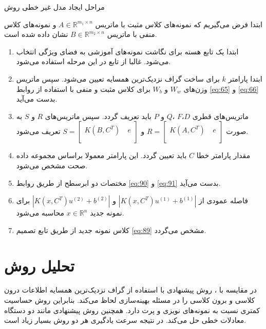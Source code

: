 \begin{algo}
	مراحل ایجاد مدل غیر خطی روش  
	
	ابتدا فرض می‌گیریم که نمونه‌های کلاس مثبت با ماتریس  $A\in {{\mathbb{R}}^{{{m}_{1}}\times n}}$ و نمونه‌های کلاس منفی با ماتریس  $B\in {{\mathbb{R}}^{{{m}_{2}}\times n}}$ نشان داده شده است.
	
	\begin{enumerate}
		\item ابتدا یک تابع هسته برای نگاشت نمونه‌های آموزشی به فضای ویژگی انتخاب می‌شود. غالبا از تابع  در این مرحله استفاده می‌شود.
		\item ابتدا پارامتر  $k$ برای ساخت گراف نزدیک‌ترین همسایه تعیین می‌شود. سپس ماتریس وزن‌های  $W_{w}$ و   $W_{b}$ برای کلاس مثبت و منفی با استفاده از روابط \ref{eq:65} و \ref{eq:66} بدست می‌آید.
		\item ماتریس‌های قطری  $D$،$F$ ،$Q$  و $P$ باید تعریف گردد. سپس ماتریس‌های $R$ و  $S$ به صورت  $R=\left[ \begin{matrix} K(A,{{C}^{T}})\ & e  \\ \end{matrix} \right]$  و $S=\left[ \begin{matrix} K(B,{{C}^{T}})\ & e  \\ \end{matrix} \right]$  تعریف می‌شود.
		\item مقدار پارامتر خطا $C$ باید تعیین گردد. این پارامتر معمولا براساس مجموعه داده صحت  مشخص می‌شود.
		\item مختصات دو ابرسطح از طریق روابط \ref{eq:90} و \ref{eq:91} بدست می‌آید.
		\item فاصله عمودی از $|K(x,{C}^{T}){{u}^{(1)}}+{{b}^{(1)}}|$ و  $|K(x,{C}^{T}){{u}^{(2)}}+{{b}^{(2)}}|$ برای نمونه جدید  $x \in \mathbb{R}^{n}$ محاسبه می‌شود.
		\item کلاس نمونه جدید از طریق تابع تصمیم \ref{eq:89} مشخص می‌گردد.
	\end{enumerate}
\end{algo}

\section{تحلیل روش }\label{sec:3:4}
در مقایسه با ، روش پیشنهادی با استفاده از گراف نزدیک‌ترین همسایه اطلاعات درون کلاسی و برون کلاسی را در مسئله بهینه‌سازی لحاظ می‌کند. بنابراین روش  حساسیت کمتری نسبت به نمونه‌های نویزی و پرت دارد. همچنین روش پیشنهادی مانند  دو دستگاه معادلات خطی حل می‌کند. در نتیجه سرعت یادگیری هر دو روش بسیار زیاد است.

